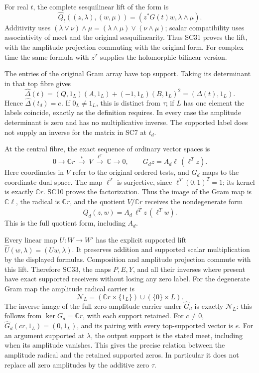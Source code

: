 \documentclass[11pt,a4paper]{article}
\theoremstyle{definition}\newtheorem{definition}[theorem]{Definition}
\begin{document}
For real \(t\), the complete sesquilinear lift of the form is
\[
 \widehat Q_t((z,\lambda),(w,\mu))
  =(z^*G(t)w,\lambda\wedge\mu).
 \tag{SC31}
\]
Additivity uses
\((\lambda\vee\nu)\wedge\mu
=(\lambda\wedge\mu)\vee(\nu\wedge\mu)\);
scalar compatibility uses associativity of meet and the
original sesquilinearity. Thus SC31 proves the lift, with the
amplitude projection commuting with the original form.
For complex time the same formula with \(z^T\) supplies the
holomorphic bilinear version.

The entries of the original Gram array have top support.
Taking its determinant in that top fibre gives
\[
 \widehat\Delta(t)
 =(Q,1_L)(A,1_L)+(-1,1_L)(B,1_L)^2
 =(\Delta(t),1_L).
 \tag{SC32}
\]
Hence \(\widehat\Delta(t_d)=e\). If \(0_L\ne1_L\), this is
distinct from \(\tau\); if \(L\) has one element the labels
coincide, exactly as the definition requires. In every case the
amplitude determinant is zero and has no multiplicative
inverse. The supported label does not supply an inverse for
the matrix in SC7 at \(t_d\).

At the central fibre, the exact sequence of ordinary vector
spaces is
\[
 0\longrightarrow\mathbb Cr
 \ \xrightarrow{\ \iota\ }\ V
 \ \xrightarrow{\ \ell^T\ }\ \mathbb C
 \longrightarrow0,\qquad
 G_dz=A_d\ell\,(\ell^Tz).
 \tag{SC33}
\]
Here coordinates in \(V\) refer to the original ordered tests,
and \(G_d\) maps to the coordinate dual space. The map
\(\ell^T\) is surjective, since \(\ell^T(0,1)^T=1\);
its kernel is exactly \(\mathbb Cr\). SC10 proves the
factorization. Thus the image of the Gram map is
\(\mathbb C\ell\), the radical is \(\mathbb Cr\), and the
quotient \(V/\mathbb Cr\) receives the nondegenerate form
\[
 Q_d(z,w)=A_d\,\overline{\ell^Tz}\,(\ell^Tw).
 \tag{SC34}
\]
This is the full quotient form, including \(A_d\).

Every linear map \(U:W\to W'\) has the explicit supported lift
\(\widehat U(w,\lambda)=(Uw,\lambda)\).
It preserves addition and supported scalar multiplication by
the displayed formulas. Composition and amplitude projection
commute with this lift. Therefore SC33, the maps \(P,E,Y\),
and all their inverses where present have exact supported
receivers without losing any zero label.
For the degenerate Gram map the amplitude radical carrier is
\[
 \mathcal N_L=(\mathbb Cr\times\{1_L\})
               \cup(\{0\}\times L).
 \tag{SC35}
\]
The inverse image of the full zero-amplitude carrier under
\(\widehat G_d\) is exactly \(\mathcal N_L\): this follows
from \(\ker G_d=\mathbb Cr\), with each support retained.
For \(c\ne0\), \(\widehat G_d(cr,1_L)=(0,1_L)\), and its
pairing with every top-supported vector is \(e\).
For an argument supported at \(\lambda\), the output support
is the stated meet, including when its amplitude vanishes.
This gives the precise relation between the amplitude radical
and the retained supported zeros. In particular it does not
replace all zero amplitudes by the additive zero \(\tau\).
\end{document}
